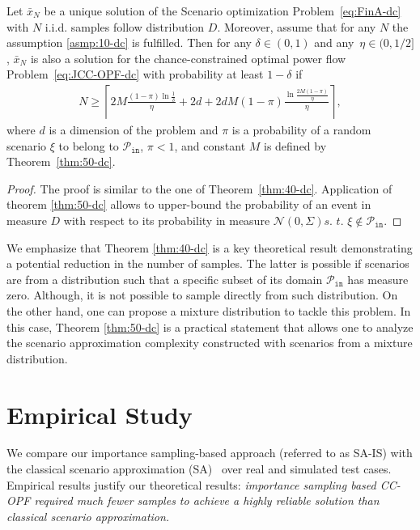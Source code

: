 \begin{theorem}\label{thm:80-dc}
Let $\bar x_N$ be a unique solution of the Scenario optimization Problem~\eqref{eq:FinA-dc} with $N$ i.i.d. samples follow distribution $D$. Moreover, assume that for any $N$ the assumption \ref{asmp:10-dc} is fulfilled. Then for any $\delta \in (0,1)$ and any~$\eta \in (0, 1/2]$, $\bar x_N$ is also a solution for the chance-constrained optimal power flow Problem~\eqref{eq:JCC-OPF-dc} with probability at least $1-\delta$ if 
\begin{align*}
  N \ge \left\lceil 2M\frac{(1-\pi)\ln \frac{1}{\delta}}{\eta} + 2d + 2d M(1-\pi) \frac{\ln\frac{2M(1-\pi)}{\eta}}{\eta} \right\rceil, 
\end{align*} 
where $d$ is a dimension of the problem and $\pi$ is a probability of a random scenario $\xi$ to belong to $\mathcal{P}_{\texttt{in}}$, $\pi < 1$, and constant $M$ is defined by Theorem~\ref{thm:50-dc}.
\end{theorem}
\begin{proof}
The proof is similar to the one of Theorem~\ref{thm:40-dc}. Application of theorem \ref{thm:50-dc} allows to upper-bound the probability of an event in measure $D$ with respect to its probability in measure $\mathcal{N}(0,\Sigma) \textit{s. t. } \xi\not\in\mathcal{P}_{\texttt{in}}$. 
\end{proof}

We emphasize that Theorem \ref{thm:40-dc} is a key theoretical result demonstrating a potential reduction in the number of samples. The latter is possible if scenarios are from a distribution such that a specific subset of its domain $\mathcal{P}_{\texttt{in}}$ has measure zero. Although, it is not possible to sample directly from such distribution. On the other hand, one can propose a mixture distribution to tackle this problem. In this case, Theorem \ref{thm:50-dc} is a practical statement that allows one to analyze the scenario approximation complexity constructed with scenarios from a mixture distribution.


\section{Empirical Study}\label{sec:emp-dc}
We compare our importance sampling-based approach (referred to as SA-IS) with the classical scenario approximation (SA)~\cite{calafiore2006scenario} over real and simulated test cases.
Empirical results justify our theoretical results: \emph{importance sampling based CC-OPF required much fewer samples to achieve a highly reliable solution than classical scenario approximation.} 

